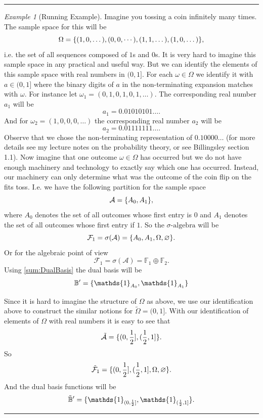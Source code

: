 \documentclass[11pt,a4paper]{article}
\theoremstyle{definition}
\theoremstyle{remark}
\newtheorem{example}{Example}
\begin{document}
	\vspace{5pt}
	\hrule
	\begin{example}[Running Example]
		\label{example:coinTossingInfinite}
		Imagine you tossing a coin infinitely many times. The sample space for this will be
		\[ \Omega = \{(1,0,\dots),(0,0,\cdots),(1,1,\dots),(1,0,\dots)\}, \]
		i.e. the set of all sequences composed of $ 1 $s and $ 0 $s. It is very hard to imagine this sample space in any practical and useful way. But we can identify the elements of this sample space with real numbers in $ (0,1] $. For each $ \omega \in \Omega $ we identify it with $ a \in (0,1] $ where the binary digits of $ a $ in the non-terminating expansion matches with $ \omega $. For instance let $ \omega_1 = (0,1,0,1,0,1,\dots) $. The corresponding real number $ a_1 $ will be
		\[ a_1 = 0.01010101\dots. \]
		And for $ \omega_2 = (1,0,0,0,\dots) $ the corresponding real number $ a_2 $ will be
		\[ a_2 = 0.01111111\dots. \]
		Observe that we chose the non-terminating representation of $ 0.10000\dots $ (for more details see my lecture notes on the probability theory, or see Billingsley section 1.1). Now imagine that one outcome $ \omega \in \Omega $ has occurred but we do not have enough machinery and technology to exactly say which one has occurred. Instead, our machinery can only determine what was the outcome of the coin flip on the fits toss. I.e. we have the following partition for the sample space
		\[ \mathcal{A} = \{A_{0},A_{1}\}, \]
		where $ A_{0} $ denotes the set of all outcomes whose first entry is 0 and $ A_1 $ denotes the set of all outcomes whose first entry if $ 1 $. So the $\sigma\text{-algebra}$ will be
		\[ \mathcal{F}_1 = \sigma(\mathcal{A}) = \{A_0,A_1,\Omega,\varnothing\}. \]
		Or for the algebraic point of view
		\[ \mathcal{F}_1 = \sigma(\mathcal{A}) = \mathbb{F}_1 \oplus \mathbb{F}_2. \]
		Using \autoref{sum:DualBasis} the dual basis will be
		\[ \mathbb{B}' = \set{\mathds{1}_{A_0},\mathds{1}_{A_1}} \]
		
		Since it is hard to imagine the structure of $ \Omega $ as above, we use our identification above to construct the similar notions for $ \tilde\Omega = (0,1] $.
		With our identification of elements of $ \Omega $ with real numbers it is easy to see that
		\[ \tilde{\mathcal{A}} = \{(0,\frac{1}{2}],(\frac{1}{2},1]\}. \]
		So 
		\[ \tilde{\mathcal{F}}_1 = \{(0,\frac{1}{2}],(\frac{1}{2},1],\Omega, \varnothing\}. \]
		And the dual basis functions will be
		\[ \tilde{\mathbb{B}}' = \set{\mathds{1}_{(0,\frac{1}{2}]},\mathds{1}_{(\frac{1}{2},1]}}. \]
	\end{example}
	\hrule
	\vspace{5pt}
	
\end{document}
